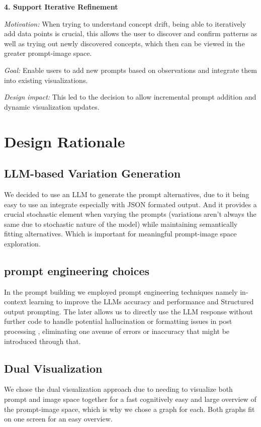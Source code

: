 \documentclass[
  a4paper,  %
  twoside,  %
  bibliography=totoc,
  headsepline,
  cleardoublepage=empty,
  parskip=half,
  draft=false
]{scrbook}
\begin{document}
\textbf{4. Support Iterative Refinement}

\textit{Motivation:} When trying to understand concept drift, being able to iteratively add data points is crucial, this allows the user to discover and confirm patterns as well as trying out newly discovered concepts, which then can be viewed in the greater prompt-image space.

\textit{Goal:} Enable users to add new prompts based on observations and integrate them into existing visualizations.

\textit{Design impact:} This led to the decision to allow incremental prompt addition and dynamic visualization updates.

\section{Design Rationale}
\label{sec:design}
 \subsection{LLM-based Variation Generation} 
 We decided to use an LLM to generate the prompt alternatives, due to it being easy to use an integrate especially with JSON formated output. And it provides a crucial stochastic element when varying the prompts (variations aren't always the same due to stochastic nature of the model) while maintaining semantically fitting alternatives. Which is important for meaningful prompt-image space exploration.
\subsection{prompt engineering choices}
  In the prompt building we employed prompt engineering techniques namely in-context learning to improve the LLMs accuracy and performance and Structured output prompting. The later allows us to directly use the LLM response without further code to handle potential hallucination or formatting issues in post processing \cite{LLMoutputconstraints}, eliminating one avenue of errors or inaccuracy that might be introduced through that. 
\subsection{Dual Visualization}
We chose the dual visualization approach due to needing to visualize both prompt and image space together for a fast cognitively easy and large overview of the prompt-image space, which is why we chose a graph for each. Both graphs fit on one screen for an easy overview. 
\end{document}
